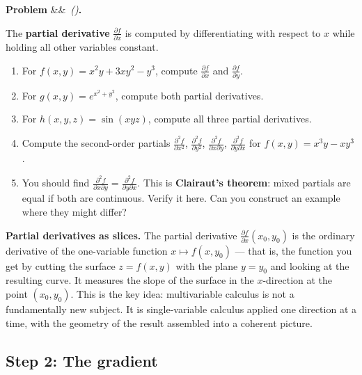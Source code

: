 \documentclass[12pt, a4paper]{article}
\newcounter{problem}
\newenvironment{problem}[1][]{%
  \refstepcounter{problem}%
  \par\vspace{6pt}%
  \noindent\textbf{\color{MidBlue}Problem \theproblem}%
  \ifx&#1&\else\ \textit{(#1)}\fi\textbf{.}\enskip
}{\par\vspace{4pt}}
\begin{document}
\begin{problem}
\label{prob:partial}
The \textbf{partial derivative} $\frac{\partial f}{\partial x}$ is computed by differentiating with respect to $x$ while holding all other variables constant.
\begin{enumerate}[label=(\alph*), topsep=2pt]
  \item For $f(x,y) = x^2 y + 3xy^2 - y^3$, compute $\frac{\partial f}{\partial x}$ and $\frac{\partial f}{\partial y}$.
  \item For $g(x,y) = e^{x^2 + y^2}$, compute both partial derivatives.
  \item For $h(x,y,z) = \sin(xyz)$, compute all three partial derivatives.
  \item Compute the second-order partials $\frac{\partial^2 f}{\partial x^2}$, $\frac{\partial^2 f}{\partial y^2}$, $\frac{\partial^2 f}{\partial x \partial y}$, $\frac{\partial^2 f}{\partial y \partial x}$ for $f(x,y) = x^3y - xy^3$.
  \item You should find $\frac{\partial^2 f}{\partial x \partial y} = \frac{\partial^2 f}{\partial y \partial x}$. This is \textbf{Clairaut's theorem}: mixed partials are equal if both are continuous. Verify it here. Can you construct an example where they might differ?
\end{enumerate}
\end{problem}

\begin{thought}
\textbf{Partial derivatives as slices.}
The partial derivative $\frac{\partial f}{\partial x}(x_0, y_0)$ is the ordinary derivative of the one-variable function $x \mapsto f(x, y_0)$ --- that is, the function you get by cutting the surface $z = f(x,y)$ with the plane $y = y_0$ and looking at the resulting curve. It measures the slope of the surface in the $x$-direction at the point $(x_0, y_0)$. This is the key idea: multivariable calculus is not a fundamentally new subject. It is single-variable calculus applied one direction at a time, with the geometry of the result assembled into a coherent picture.
\end{thought}

\subsection{Step 2: The gradient}
\end{document}
